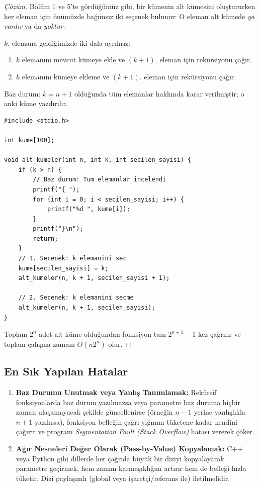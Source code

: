 \begin{proof}[Çözüm]
Bölüm 1 ve 5'te gördüğümüz gibi, bir kümenin alt kümesini oluştururken her eleman için önümüzde bağımsız iki seçenek bulunur: O eleman alt kümede \emph{ya vardır} ya da \emph{yoktur}.

$k$. elemana geldiğimizde iki dala ayrılırız:
\begin{enumerate}
    \item $k$ elemanını mevcut kümeye ekle ve $(k+1)$. eleman için rekürsiyonu çağır.
    \item $k$ elemanını kümeye ekleme ve $(k+1)$. eleman için rekürsiyonu çağır.
\end{enumerate}
Baz durum: $k = n+1$ olduğunda tüm elemanlar hakkında karar verilmiştir; o anki küme yazdırılır.

\begin{lstlisting}[language=CTemel]
#include <stdio.h>

int kume[100];

void alt_kumeler(int n, int k, int secilen_sayisi) {
    if (k > n) {
        // Baz durum: Tum elemanlar incelendi
        printf("{ ");
        for (int i = 0; i < secilen_sayisi; i++) {
            printf("%d ", kume[i]);
        }
        printf("}\n");
        return;
    }
    // 1. Secenek: k elemanini sec
    kume[secilen_sayisi] = k;
    alt_kumeler(n, k + 1, secilen_sayisi + 1);

    // 2. Secenek: k elemanini secme
    alt_kumeler(n, k + 1, secilen_sayisi);
}
\end{lstlisting}
Toplam $2^n$ adet alt küme olduğundan fonksiyon tam $2^{n+1}-1$ kez çağrılır ve toplam çalışma zamanı $O(n 2^n)$ olur.
\end{proof}

\subsection*{En Sık Yapılan Hatalar}
\begin{enumerate}
    \item \textbf{Baz Durumu Unutmak veya Yanlış Tanımlamak:} Rekürsif fonksiyonlarda baz durum yazılmazsa veya parametre baz duruma hiçbir zaman ulaşamayacak şekilde güncellenirse (örneğin $n-1$ yerine yanlışlıkla $n+1$ yazılırsa), fonksiyon belleğin çağrı yığınını tüketene kadar kendini çağırır ve program \emph{Segmentation Fault (Stack Overflow)} hatası vererek çöker.
    \item \textbf{Ağır Nesneleri Değer Olarak (Pass-by-Value) Kopyalamak:} C++ veya Python gibi dillerde her çağrıda büyük bir diziyi kopyalayarak parametre geçirmek, hem zaman karmaşıklığını artırır hem de belleği hızla tüketir. Dizi paylaşımlı (global veya işaretçi/referans ile) iletilmelidir.
\end{enumerate}

